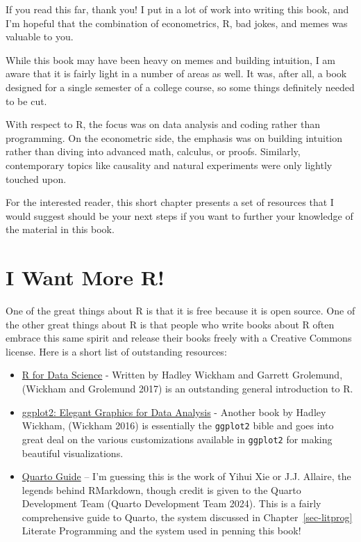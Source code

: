 \documentclass[
  letterpaper,
]{book}
\providecommand{\tightlist}{%
  \setlength{\itemsep}{0pt}\setlength{\parskip}{0pt}}\usepackage{longtable,booktabs,array}
\begin{document}
If you read this far, thank you! I put in a lot of work into writing
this book, and I'm hopeful that the combination of econometrics, R, bad
jokes, and memes was valuable to you.

While this book may have been heavy on memes and building intuition, I
am aware that it is fairly light in a number of areas as well. It was,
after all, a book designed for a single semester of a college course, so
some things definitely needed to be cut.

With respect to R, the focus was on data analysis and coding rather than
programming. On the econometric side, the emphasis was on building
intuition rather than diving into advanced math, calculus, or proofs.
Similarly, contemporary topics like causality and natural experiments
were only lightly touched upon.

For the interested reader, this short chapter presents a set of
resources that I would suggest should be your next steps if you want to
further your knowledge of the material in this book.

\section{I Want More R!}\label{i-want-more-r}

One of the great things about R is that it is free because it is open
source. One of the other great things about R is that people who write
books about R often embrace this same spirit and release their books
freely with a Creative Commons license. Here is a short list of
outstanding resources:

\begin{itemize}
\tightlist
\item
  \href{https://r4ds.had.co.nz/}{R for Data Science} - Written by Hadley
  Wickham and Garrett Grolemund, (Wickham and Grolemund 2017) is an
  outstanding general introduction to R.
\item
  \href{https://ggplot2-book.org/}{ggplot2: Elegant Graphics for Data
  Analysis} - Another book by Hadley Wickham, (Wickham 2016) is
  essentially the \texttt{ggplot2} bible and goes into great deal on the
  various customizations available in \texttt{ggplot2} for making
  beautiful visualizations.
\item
  \href{https://quarto.org/docs/guide/}{Quarto Guide} -- I'm guessing
  this is the work of Yihui Xie or J.J. Allaire, the legends behind
  RMarkdown, though credit is given to the Quarto Development Team
  (Quarto Development Team 2024). This is a fairly comprehensive guide
  to Quarto, the system discussed in Chapter~\ref{sec-litprog} Literate
  Programming and the system used in penning this book!
\end{itemize}
\end{document}
